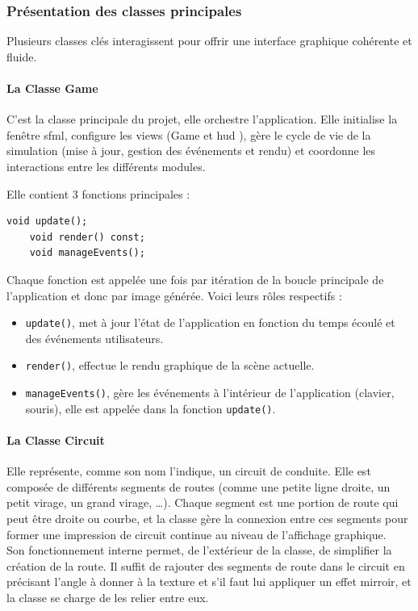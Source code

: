 \subsubsection{Présentation des classes principales}\label{subsubsec:presentation-des-classes-principales}
Plusieurs classes clés interagissent pour offrir une interface graphique cohérente et fluide.

\paragraph[Game]{La Classe \textbf{Game}}\label{par:class_game}
C'est la classe principale du projet, elle orchestre l'application.
Elle initialise la fenêtre \gls{sfml}, configure les \glspl{view} (Game  et \gls{hud} ), gère le cycle de vie de la simulation (mise à jour, gestion des événements et rendu) et coordonne les interactions entre les différents modules.

Elle contient 3 fonctions principales :
\begin{lstlisting}[style=CStyle, label={lst:game_class}]
    void update();
    void render() const;
    void manageEvents();
\end{lstlisting}
Chaque fonction est appelée une fois par itération de la boucle principale de l'application et donc par image générée.
Voici leurs rôles respectifs :
\begin{itemize}
    \item \texttt{update()}, met à jour l'état de l'application en fonction du temps écoulé et des événements utilisateurs.
    \item \texttt{render()}, effectue le rendu graphique de la scène actuelle.
    \item \texttt{manageEvents()}, gère les événements à l'intérieur de l'application (clavier, souris), elle est appelée dans la fonction \texttt{update()}.
\end{itemize}

\paragraph[Circuit]{La Classe \textbf{Circuit}}
Elle représente, comme son nom l'indique, un circuit de conduite.
Elle est composée de différents segments de routes (comme une petite ligne droite, un petit virage, un grand virage, \dots).
Chaque segment est une portion de route qui peut être droite ou courbe, et la classe gère la connexion entre ces segments pour former une impression de circuit continue au niveau de l'affichage graphique. \\
Son fonctionnement interne permet, de l'extérieur de la classe, de simplifier la création de la route.
Il suffit de rajouter des segments de route dans le circuit en précisant l'angle à donner à la texture et s'il faut lui appliquer un effet mirroir, et la classe se charge de les relier entre eux.

